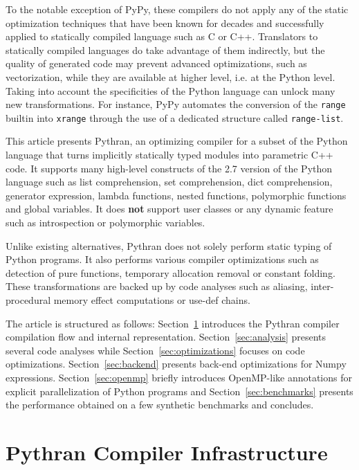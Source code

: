 \documentclass[10pt, onecolumn, preprint]{sigplanconf}
\begin{document}
To the notable exception of PyPy, these compilers do not apply any of the
static optimization techniques that have been known for decades and
successfully applied to statically compiled language such as C or C++.
Translators to statically compiled languages do take advantage of them
indirectly, but the quality of generated code may prevent advanced
optimizations, such as vectorization, while they are available at higher level,
i.e. at the Python level. Taking into account the specificities of the Python
language can unlock many new transformations. For instance, PyPy automates the
conversion of the \texttt{range} builtin into \texttt{xrange} through the use
of a dedicated structure called \texttt{range-list}.

This article presents Pythran, an optimizing compiler for a subset of the
Python language that turns implicitly statically typed modules into parametric
C++ code. It supports many high-level constructs of the 2.7 version of the
Python language such as list comprehension, set comprehension, dict
comprehension, generator expression, lambda functions, nested functions,
polymorphic functions and global variables. It does \textbf{not} support user
classes or any dynamic feature such as introspection or polymorphic variables.

Unlike existing alternatives, Pythran does not solely perform static typing of
Python programs. It also performs various compiler optimizations such as
detection of pure functions, temporary allocation removal or constant folding.
These transformations are backed up by code analyses such as aliasing,
inter-procedural memory effect computations or use-def chains.

The article is structured as follows: Section~\ref{sec:infrastructure}
introduces the Pythran compiler compilation flow and internal representation.
Section~\ref{sec:analysis} presents several code analyses while
Section~\ref{sec:optimizations} focuses on code optimizations.
Section~\ref{sec:backend} presents back-end optimizations for Numpy
expressions. Section~\ref{sec:openmp}  briefly introduces OpenMP-like
annotations for explicit parallelization of Python programs and
Section~\ref{sec:benchmarks} presents the performance obtained on a few
synthetic benchmarks and concludes.


\section{Pythran Compiler Infrastructure}
\label{sec:infrastructure}
\end{document}
